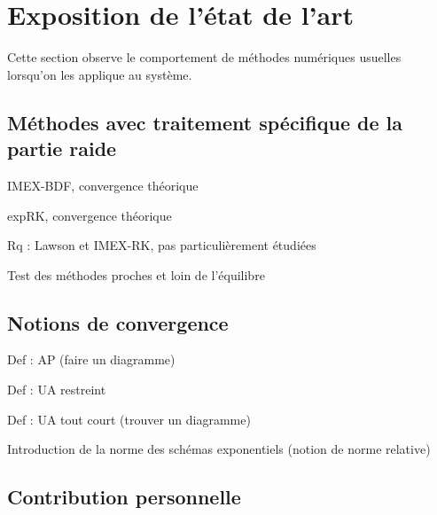 \section*{Exposition de l'état de l'art}

Cette section observe le comportement de méthodes numériques usuelles lorsqu'on les applique au système.

\subsection*{Méthodes avec traitement spécifique de la partie raide}

IMEX-BDF, convergence théorique

expRK, convergence théorique

Rq : Lawson et IMEX-RK, pas particulièrement étudiées

Test des méthodes proches et loin de l'équilibre

\subsection*{Notions de convergence}

Def : AP (faire un diagramme)

Def : UA restreint

Def : UA tout court (trouver un diagramme)

Introduction de la norme des schémas exponentiels
(notion de norme relative)

\subsection*{Contribution personnelle}
